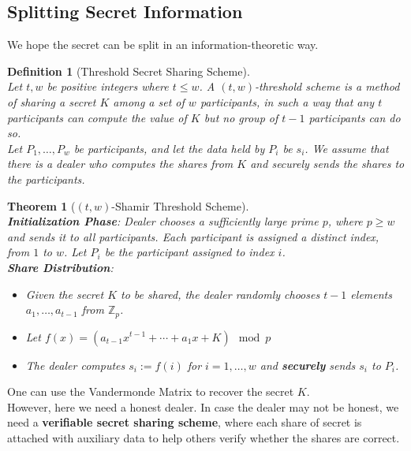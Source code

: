 \documentclass[12pt]{article}
\newtheorem{definition}{Definition}[section]
\newtheorem{theorem}{Theorem}[section]
\theoremstyle{definition}
\begin{document}
\subsection{Splitting Secret Information}
We hope the secret can be split in an information-theoretic way.
\begin{definition}[Threshold Secret Sharing Scheme]
\hfill\\\normalfont Let $t,w$ be positive integers where $t\leq w$. A $(t,w)$-threshold scheme is a method of sharing a secret $K$ among a set of $w$ participants, in such a way that any $t$ participants can compute the value of $K$ but no group of $t-1$ participants can do so.\\
Let $P_1,\ldots, P_w$ be participants, and let the data held by $P_i$ be $s_i$. We assume that there is a dealer who computes the \textit{shares} from $K$ and securely sends the shares to the participants. 
\end{definition}
\begin{theorem}[{$(t,w)$}-Shamir Threshold Scheme]
\hfill\\\normalfont \textbf{Initialization Phase}: Dealer chooses a sufficiently large prime $p$, where $p\geq w$ and sends it to all participants. Each participant is assigned a distinct index, from $1$ to $w$. Let $P_i$ be the participant assigned to index $i$.\\
\textbf{Share Distribution}:
\begin{itemize}
  \item Given the secret $K$ to be shared, the dealer randomly chooses $t-1$ elements $a_1,\ldots, a_{t-1}$ from $\mathbb{Z}_p$.
  \item Let $f(x)=(a_{t-1}x^{t-1}+\cdots+a_1x+K)\mod p$
  \item The dealer computes $s_i:=f(i)$ for $i=1,\ldots, w$ and \textbf{securely} sends $s_i$ to $P_i$.
\end{itemize}
\end{theorem}
One can use the Vandermonde Matrix to recover the secret $K$.\\
However, here we need a honest dealer. In case the dealer may not be honest, we need a \textbf{verifiable secret sharing scheme}, where each share of secret is attached with auxiliary data to help others verify whether the shares are correct.
\end{document}
